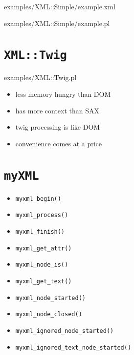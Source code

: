 \documentclass{beamer}
\def\Piss{\item[\lower.5ex\hbox{\XSolidBrush}]}
\def\Yeah{\item[\Checkmark]}
\begin{document}
\begin{frame}[fragile]

	{examples/XML::Simple/example.xml}
\end{frame}

\begin{frame}[fragile]

	{examples/XML::Simple/example.pl}
\end{frame}

\section{\texttt{XML::Twig}}

\begin{frame}[fragile]

	{examples/XML::Twig.pl}
\end{frame}

\begin{frame}
\begin{itemize}
\Yeah	less memory-hungry than DOM
\Yeah	has more context than SAX
\Piss	twig processing is like DOM
\Piss	convenience comes at a price
\end{itemize}
\end{frame}

\section{\texttt{myXML}}

\begin{frame}[fragile]
\begin{multicols}{2}
\begin{itemize}
\item	\verb|myxml_begin()|
\item	\verb|myxml_process()|
\item	\verb|myxml_finish()|
\columnbreak
\item	\verb|myxml_get_attr()|
\item	\verb|myxml_node_is()|
\item	\verb|myxml_get_text()|
\end{itemize}
\end{multicols}

\begin{itemize}
\item	\verb|myxml_node_started()|
\item	\verb|myxml_node_closed()|
\item	\verb|myxml_ignored_node_started()|
\item	\verb|myxml_ignored_text_node_started()|
\end{itemize}
\end{frame}
\end{document}

